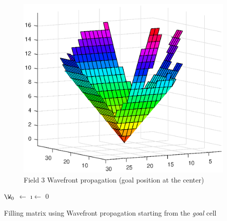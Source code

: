 \begin{figure}[ht]
    \centering
    \includegraphics[width=0.95\textwidth]{figures/C3/WavefrontSurfF3-3.eps}
    \caption{Field 3 Wavefront propagation (goal position at the center)}
    \label{fig:iwavefront-surf-f3}
\end{figure}
\begin{algorithm}[H]
	
	\BlankLine
	
  	$\W_0$ $\leftarrow$ \GCell \;
	\i $\leftarrow$ 0 \;
\caption{Filling matrix using Wavefront propagation starting from the \textit{goal} cell}
\label{alg:Bambi-Wavefront}
\end{algorithm}




